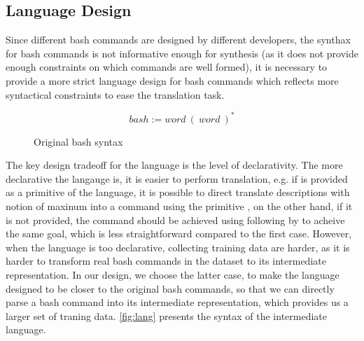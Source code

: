 \subsection{Language Design}
\label{subsec:represent}

Since different bash commands are designed by different developers, the synthax for bash commands is not informative enough for synthesis (as it does not provide enough constraints on which commands are well formed), it is necessary to provide a more strict language design for bash commands which reflects more syntactical constraints to ease the translation task.

\begin{figure}[ht]
\[
\mathit{bash} := \mathit{word}~(~\mathit{word}~)^{*}
\]
\vspace{-20pt}
\caption{Original bash syntax}
\end{figure}

The key design tradeoff for the language is the level of declarativity. The more declarative the langauge is, it is easier to perform translation, e.g. if  is provided as a primitive of the language, it is possible to direct translate descriptions with notion of maxinum into a command using the primitive , on the other hand, if it is not provided, the command should be achieved using  following by  to acheive the same goal, which is less straightforward compared to the first case. However, when the language is too declarative, collecting training data are harder, as it is harder to transform real bash commands in the dataset to its intermediate representation. In our design, we choose the latter case, to make the language designed to be closer to the original bash commands, so that we can directly parse a bash command into its intermediate representation, which provides us a larger set of traning data. \autoref{fig:lang} presents the syntax of the intermediate language.

